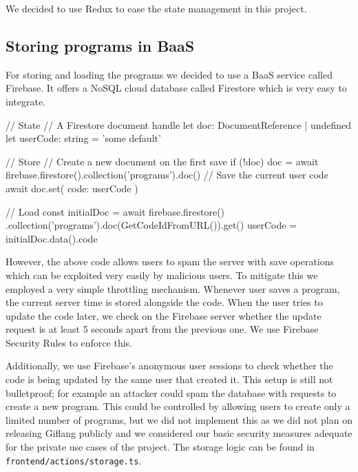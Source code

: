 We decided to use Redux to ease the state management in this project.

\subsection{Storing programs in BaaS}
For storing and loading the programs we decided to use a BaaS service called Firebase. It offers a NoSQL cloud database called Firestore which is very easy
to integrate.
\begin{code}
// State
// A Firestore document handle
let doc: DocumentReference | undefined
let userCode: string = 'some default'

// Store
// Create a new document on the first save
if (!doc) {
    doc = await firebase.firestore().collection('programs').doc()
}
// Save the current user code
await doc.set({ code: userCode })

// Load
const initialDoc = 
    await firebase.firestore()
        .collection('programs').doc(GetCodeIdFromURL()).get()
userCode = initialDoc.data().code
\end{code}

However, the above code allows users to spam the server with save operations which can be exploited very easily by malicious users. To mitigate this we employed a very simple
throttling mechanism. Whenever user saves a program, the current server time is stored alongside the code. When the user tries to update the code later, we check
on the Firebase server whether the update request is at least 5 seconds apart from the previous one. We use Firebase Security Rules to enforce this.

Additionally, we use Firebase's anonymous user sessions to check whether the code is being updated by the same user that created it. This setup is still not
bulletproof; for example an attacker could spam the database with requests to create a new program. This could be controlled by allowing users to create only
a limited number of programs, but we did not implement this as we did not plan on releasing Giflang publicly and we considered our basic security measures
adequate for the private use cases of the project. The storage logic can be found in \texttt{frontend/actions/storage.ts}.